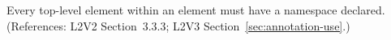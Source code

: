 Every top-level element within an  element must have a
namespace declared.  (References: L2V2 Section~3.3.3;
L2V3 Section~\ref{sec:annotation-use}.)
